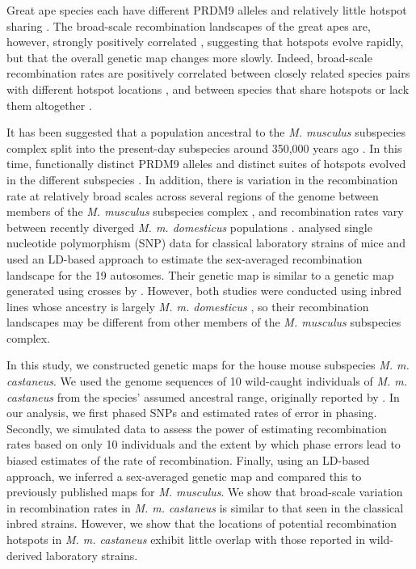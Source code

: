 Great ape species each have different PRDM9 alleles \citep{RN264} and relatively little hotspot sharing \citep{RN214, RN221}. The broad-scale recombination landscapes of the great apes are, however, strongly positively correlated \citep{RN221}, suggesting that hotspots evolve rapidly, but that the overall genetic map changes more slowly. Indeed, broad-scale recombination rates are positively correlated between closely related species pairs with different hotspot locations \citep{RN174}, and between species that share hotspots or lack them altogether \citep{RN258,RN259}.
 
It has been suggested that a population ancestral to the \textit{M. musculus} subspecies complex split into the present-day subspecies around 350,000 years ago \citep{RN315}. In this time, functionally distinct PRDM9 alleles and distinct suites of hotspots evolved in the different subspecies \citep{RN249}. In addition, there is variation in the recombination rate at relatively broad scales across several regions of the genome between members of the \textit{M. musculus} subspecies complex \citep{RN244}, and recombination rates vary between recently diverged \textit{M. m. domesticus} populations \citep{RN267}. \cite{RN156} analysed single nucleotide polymorphism (SNP) data for classical laboratory strains of mice and used an LD-based approach to estimate the sex-averaged recombination landscape for the 19 autosomes. Their genetic map is similar to a genetic map generated using crosses by \cite{RN232}. However, both studies were conducted using inbred lines whose ancestry is largely \textit{M. m. domesticus} \citep{RN243}, so their recombination landscapes may be different from other members of the \textit{M. musculus} subspecies complex.
 
In this study, we constructed genetic maps for the house mouse subspecies \textit{M. m. castaneus}. We used the genome sequences of 10 wild-caught individuals of \textit{M. m. castaneus} from the species’ assumed ancestral range, originally reported by \cite{RN122}. In our analysis, we first phased SNPs and estimated rates of error in phasing. Secondly, we simulated data to assess the power of estimating recombination rates based on only 10 individuals and the extent by which phase errors lead to biased estimates of the rate of recombination. Finally, using an LD-based approach, we inferred a sex-averaged genetic map and compared this to previously published maps for \textit{M. musculus}. We show that broad-scale variation in recombination rates in \textit{M. m. castaneus} is similar to that seen in the classical inbred strains. However, we show that the locations of potential recombination hotspots in \textit{M. m. castaneus} exhibit little overlap with those reported in wild-derived laboratory strains.

